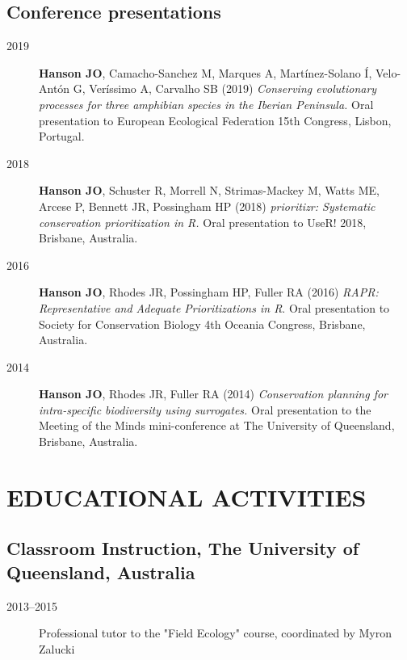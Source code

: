 \documentclass[12pt,a4paper]{article}
\begin{document}
\subsection*{Conference presentations}
\begin{description}

\item[2019] \textbf{Hanson JO}, Camacho-Sanchez M, Marques A, Martínez-Solano Í, Velo-Antón G, Veríssimo A, Carvalho SB (2019) \textit{Conserving evolutionary processes for three amphibian species in the Iberian Peninsula.} Oral presentation to European Ecological Federation 15th Congress, Lisbon, Portugal.

\item[2018] \textbf{Hanson JO}, Schuster R, Morrell N, Strimas-Mackey M, Watts ME, Arcese P, Bennett JR, Possingham HP (2018) \textit{prioritizr: Systematic conservation prioritization in R.} Oral presentation to UseR! 2018, Brisbane, Australia.

\item[2016] \textbf{Hanson JO}, Rhodes JR, Possingham HP, Fuller RA (2016) \textit{RAPR: Representative and Adequate Prioritizations in R}. Oral presentation to Society for Conservation Biology 4th Oceania Congress, Brisbane, Australia.

\item[2014] \textbf{Hanson JO}, Rhodes JR, Fuller RA (2014) \textit{Conservation planning for intra-specific biodiversity using surrogates.} Oral presentation to the Meeting of the Minds mini-conference at The University of Queensland, Brisbane, Australia.

\end{description}

\section*{EDUCATIONAL ACTIVITIES}

\subsection*{Classroom Instruction, The University of Queensland, Australia}
\begin{description}

\item[2013--2015] Professional tutor to the "Field Ecology" course, coordinated by Myron Zalucki

\end{description}
\end{document}
